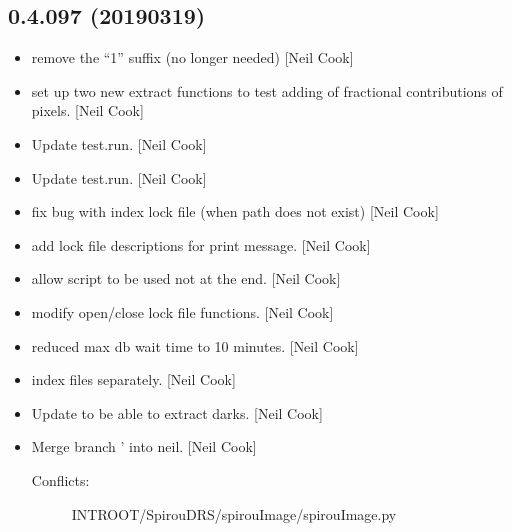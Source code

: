 \documentclass[a4paper,10pt,english]{report}
\begin{document}
\subsection{0.4.097 (2019\sphinxhyphen{}03\sphinxhyphen{}19)}
\label{\detokenize{misc/changelog:id181}}\begin{itemize}
\item {} 
 \sphinxhyphen{} remove the “1” suffix (no longer needed) {[}Neil
Cook{]}

\item {} 
 \sphinxhyphen{} set up two new extract functions to test adding of
fractional contributions of pixels. {[}Neil Cook{]}

\item {} 
Update test.run. {[}Neil Cook{]}

\item {} 
Update test.run. {[}Neil Cook{]}

\item {} 
 \sphinxhyphen{} fix bug with index lock file (when path does not
exist) {[}Neil Cook{]}

\item {} 
 \sphinxhyphen{} add lock file descriptions for print message. {[}Neil
Cook{]}

\item {} 
 \sphinxhyphen{} allow  script to be used not at the end.
{[}Neil Cook{]}

\item {} 
 \sphinxhyphen{} modify open/close lock file functions. {[}Neil Cook{]}

\item {} 
 \sphinxhyphen{} reduced max db wait time to 10 minutes.
{[}Neil Cook{]}

\item {} 
 \sphinxhyphen{} index files separately. {[}Neil Cook{]}

\item {} 
Update  to be able to extract darks. {[}Neil Cook{]}

\item {} 
Merge branch ’ into neil. {[}Neil Cook{]}
\begin{description}
\item[{Conflicts:}] \leavevmode
INTROOT/SpirouDRS/spirouImage/spirouImage.py


\end{description}
\end{itemize}
\end{document}
